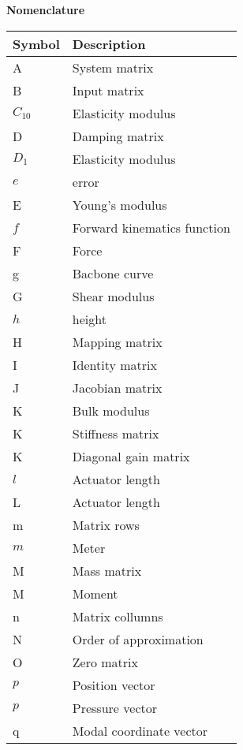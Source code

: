 \begin{spacing}{0.9}

\Large{\textbf{Nomenclature}}

\begin{multicols}{2}
\begin{table}[H]
\centering
    \begin{tabular}{p{1.5cm} p{5cm}} \hline
    \textbf{Symbol}    &   \textbf{Description }\\ \hline
    A      &  System matrix \\
    B     &  Input matrix \\
    $C_{10}$     &  Elasticity modulus \\
    D     &  Damping matrix \\
    $D_1$     &  Elasticity modulus \\
    $e$     & error \\
    E     &  Young's modulus \\
    $f$     & Forward kinematics function \\
    F     & Force \\
    g     &  Bacbone curve \\
    G     &  Shear modulus \\
    $h$     &  height \\
    H     &  Mapping matrix \\
    I     &  Identity matrix \\
    J     &  Jacobian matrix \\
    K     &  Bulk modulus \\
    K     &  Stiffness matrix \\
    K     &  Diagonal gain matrix \\
    $l$     &  Actuator length \\
    L     &  Actuator length \\
    m     &  Matrix rows \\
    $m$     &  Meter \\
    M     &  Mass matrix \\
    M     &  Moment \\
    n     &  Matrix collumns \\
    N     & Order of approximation \\
    O     &  Zero matrix \\
    $p$     & Position vector \\
    $p$     & Pressure vector \\
    q     & Modal coordinate vector \\

\end{tabular}
\end{table}
\end{multicols}
\end{spacing}
